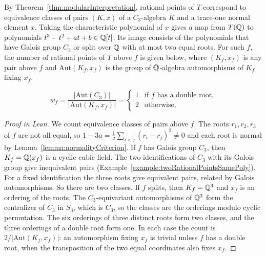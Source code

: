 \begin{equationnode}

\label{eqn:polynomialWeights}


\leanok

By Theorem~\ref{thm:modularInterpretation}, rational points of $T$ correspond to equivalence classes of pairs $(K,x)$ of a $C_3$-algebra $K$ and a trace-one normal element $x$. Taking the characteristic polynomial of $x$ gives a map from $T(\mathbb{Q})$ to polynomials $t^3-t^2+at+b\in\mathbb{Q}[t]$. Its image consists of the polynomials that have Galois group $C_3$ or split over $\mathbb{Q}$ with at most two equal roots. For such $f$, the number of rational points of $T$ above $f$ is given below, where $(K_f,x_f)$ is any pair above $f$ and $\mathrm{Aut}(K_f,x_f)$ is the group of $\mathbb{Q}$-algebra automorphisms of $K_f$ fixing $x_f$.

\begin{equation*} w_f=\frac{|\mathrm{Aut}(C_3)|}{|\mathrm{Aut}(K_f,x_f)|}= \begin{cases} 1 &\text{if $f$ has a double root,}\\ 2 &\text{otherwise,} \end{cases} \end{equation*}

\end{equationnode}

\begin{proof}[Proof in Lean]

\leanok


We count equivalence classes of pairs above $f$. The roots $r_1,r_2,r_3$ of $f$ are not all equal, so $1-3a=\frac12\sum_{i<j}(r_i-r_j)^2\neq0$ and each root is normal by Lemma~\ref{lemma:normalityCriterion}. If $f$ has Galois group $C_3$, then $K_f=\mathbb{Q}(x_f)$ is a cyclic cubic field. The two identifications of $C_3$ with its Galois group give inequivalent pairs (Example~\ref{example:twoRationalPointsSamePoly}). For a fixed identification the three roots give equivalent pairs, related by Galois automorphisms. So there are two classes. If $f$ splits, then $K_f=\mathbb{Q}^3$ and $x_f$ is an ordering of the roots. The $C_3$-equivariant automorphisms of $\mathbb{Q}^3$ form the centralizer of $C_3$ in $S_3$, which is $C_3$, so the classes are the orderings modulo cyclic permutation. The six orderings of three distinct roots form two classes, and the three orderings of a double root form one. In each case the count is $2/|\mathrm{Aut}(K_f,x_f)|$: an automorphism fixing $x_f$ is trivial unless $f$ has a double root, when the transposition of the two equal coordinates also fixes $x_f$.

\end{proof}

